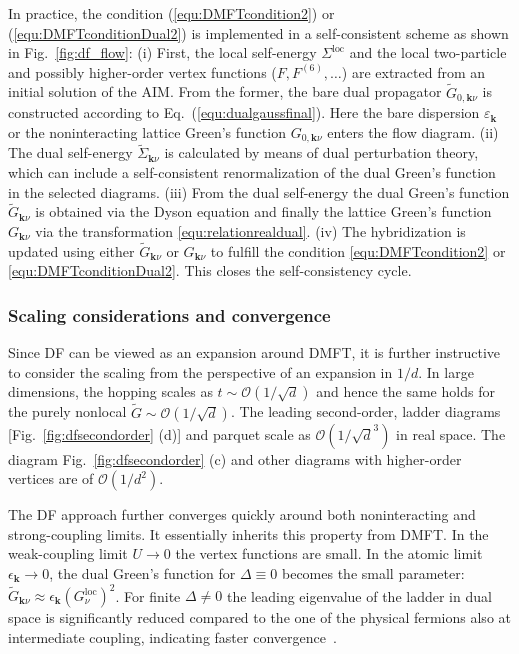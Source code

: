 \documentclass[rmp,aps,reprint,amsmath,amssymb,superscriptaddress,showpacs,nofootinbib]{revtex4-1}
\begin{document}
In practice, the condition (\ref{equ:DMFTcondition2}) or (\ref{equ:DMFTconditionDual2}) is implemented in a self-consistent scheme as shown in Fig.~\ref{fig:df_flow}: (i) First, the local self-energy $\Sigma^{\text{loc}}$ and the local two-particle and possibly higher-order vertex functions ($F,F^{(6)},\ldots$) are extracted from an initial solution of the AIM. From the former, the bare dual propagator $\widetilde{G}_{0,\mathbf{k}\nu}$ is constructed according to Eq.~(\ref{equ:dualgaussfinal}). Here the bare dispersion $\varepsilon_{{\mathbf k}}$ or the  noninteracting lattice Green's function $G_{0,\mathbf{k}\nu}$ enters  the flow diagram. (ii) The dual self-energy $\widetilde{\Sigma}_{\mathbf{k}\nu}$ is calculated by means of dual perturbation theory, which can include a self-consistent renormalization of the dual Green's function in the selected diagrams. (iii) From the dual self-energy the dual Green's function $\widetilde{G}_{\mathbf{k}\nu}$ is obtained via the Dyson equation and finally the lattice Green's function $G_{\mathbf{k}\nu}$ via the transformation \eqref{equ:relationrealdual}. (iv) The hybridization is updated using either $\widetilde{G}_{\mathbf{k}\nu}$ or $G_{\mathbf{k}\nu}$ to fulfill the condition \eqref{equ:DMFTcondition2} or \eqref{equ:DMFTconditionDual2}. This closes the self-consistency cycle. 

\subsubsection{Scaling considerations and convergence}
\label{sec:dfscaling}

Since DF can be viewed as an expansion around DMFT, it is further instructive to consider the scaling from the perspective of an expansion in $1/d$. In large dimensions, the hopping scales as $t\sim\mathcal{O}(1/\sqrt{d})$ and hence the same holds for the purely nonlocal $\tilde{G}\sim\mathcal{O}(1/\sqrt{d})$. The leading second-order, ladder diagrams [Fig.~\ref{fig:dfsecondorder} (d)] and parquet scale as $\mathcal{O}(1/\sqrt{d}^{3})$ in real space. The diagram Fig.~\ref{fig:dfsecondorder} (c) and other diagrams with higher-order vertices are of  $\mathcal{O}(1/d^{2})$.

The DF approach further converges quickly around both noninteracting and strong-coupling limits. It essentially inherits this property from DMFT. In the weak-coupling limit $U\to0$ the vertex functions are small. In the atomic limit $\epsilon_{\mathbf{k}}\to 0$, the dual Green's function for $\Delta\equiv 0$ becomes the small parameter: $\tilde{G}_{\mathbf{k}\nu}\approx \epsilon_{\mathbf{k}}(G^{\text{loc}}_\nu)^{2}$. For finite $\Delta\neq 0$ the leading eigenvalue of the ladder in dual space is significantly reduced compared to the one of the physical fermions also at intermediate coupling, indicating faster convergence~\cite{Hafermann2009}.
\end{document}
